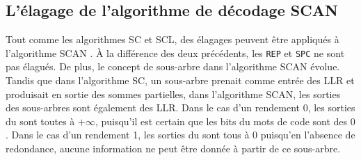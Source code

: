 \subsection{L'élagage de l'algorithme de décodage SCAN}
Tout comme les algorithmes SC et SCL, des élagages peuvent être appliqués à l'algorithme SCAN \cite{lin_reduced_2015}. \`A la différence des deux précédents, les \noeuds \texttt{REP} et \texttt{SPC} ne sont pas élagués. De plus, le concept de sous-arbre dans l'algorithme SCAN évolue. Tandis que dans l'algorithme SC, un sous-arbre prenait comme entrée des LLR et produisait en sortie des sommes partielles, dans l'algorithme SCAN, les sorties des sous-arbres sont également des LLR. Dans le cas d'un rendement 0, les sorties du \noeud sont toutes à $+\infty$, puisqu'il est certain que les bits du mots de code sont des $0$. Dans le cas d'un rendement 1, les sorties du \noeud sont tous à $0$ puisqu'en l'absence de redondance, aucune information ne peut être donnée à partir de ce sous-arbre.



